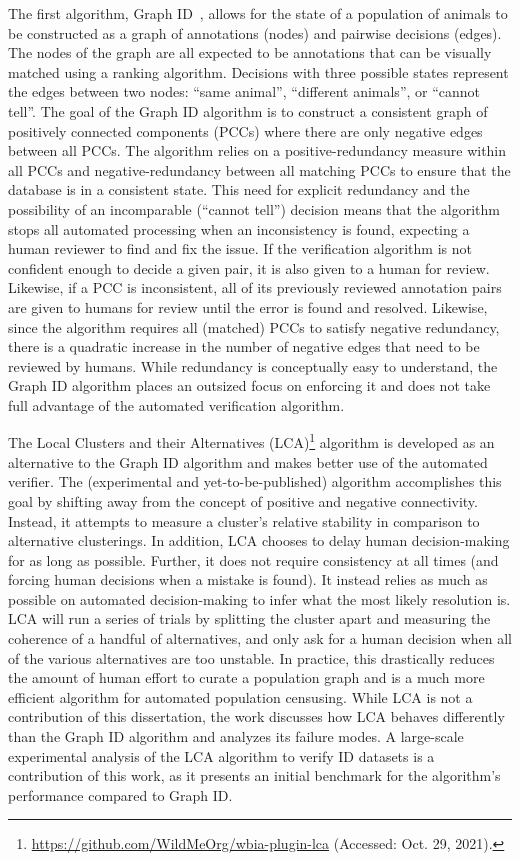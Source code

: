 The first algorithm, Graph ID~\cite{crall_identifying_2017}, allows for the state of a population of animals to be constructed as a graph of annotations (nodes) and pairwise decisions (edges).  The nodes of the graph are all expected to be annotations that can be visually matched using a ranking algorithm. Decisions with three possible states represent the edges between two nodes: ``same animal'', ``different animals'', or ``cannot tell''.  The goal of the Graph ID algorithm is to construct a consistent graph of positively connected components (PCCs) where there are only negative edges between all PCCs.  The algorithm relies on a positive-redundancy measure within all PCCs and negative-redundancy between all matching PCCs to ensure that the database is in a consistent state.  This need for explicit redundancy and the possibility of an incomparable (``cannot tell'') decision means that the algorithm stops all automated processing when an inconsistency is found, expecting a human reviewer to find and fix the issue.  If the verification algorithm is not confident enough to decide a given pair, it is also given to a human for review. Likewise, if a PCC is inconsistent, all of its previously reviewed annotation pairs are given to humans for review until the error is found and resolved.  Likewise, since the algorithm requires all (matched) PCCs to satisfy negative redundancy, there is a quadratic increase in the number of negative edges that need to be reviewed by humans.  While redundancy is conceptually easy to understand, the Graph ID algorithm places an outsized focus on enforcing it and does not take full advantage of the automated verification algorithm.

The Local Clusters and their Alternatives (LCA)\footnote{\url{https://github.com/WildMeOrg/wbia-plugin-lca} (Accessed: Oct. 29, 2021).} algorithm is developed as an alternative to the Graph ID algorithm and makes better use of the automated verifier.  The (experimental and yet-to-be-published) algorithm accomplishes this goal by shifting away from the concept of positive and negative connectivity.  Instead, it attempts to measure a cluster's relative stability in comparison to alternative clusterings. In addition, LCA chooses to delay human decision-making for as long as possible.  Further, it does not require consistency at all times (and forcing human decisions when a mistake is found).  It instead relies as much as possible on automated decision-making to infer what the most likely resolution is.  LCA will run a series of trials by splitting the cluster apart and measuring the coherence of a handful of alternatives, and only ask for a human decision when all of the various alternatives are too unstable.  In practice, this drastically reduces the amount of human effort to curate a population graph and is a much more efficient algorithm for automated population censusing.  While LCA is not a contribution of this dissertation, the work discusses how LCA behaves differently than the Graph ID algorithm and analyzes its failure modes.  A large-scale experimental analysis of the LCA algorithm to verify ID datasets is a contribution of this work, as it presents an initial benchmark for the algorithm's performance compared to Graph ID.

